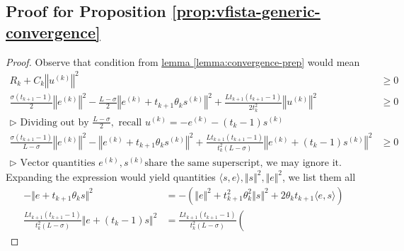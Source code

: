 \subsection{Proof for Proposition \ref*{prop:vfista-generic-convergence}}
    \begin{proof}\label{proof:vfista-generic-convergence}
        Observe that condition from \hyperref[lemma:convergence-prep]{lemma \ref*{lemma:convergence-prep}} would mean 
        \begin{align*}
            R_k + C_k\left\Vert
            u^{(k)}
            \right\Vert^2 &\ge 0
            \\
            \frac{\sigma(t_{k + 1} - 1)}{2}
            \left\Vert e^{(k)}\right\Vert^2
            - 
            \frac{L - \sigma}{2}
            \left\Vert e^{(k)} + 
                t_{k + 1}\theta_k s^{(k)}
            \right\Vert^2 
            + 
            \frac{Lt_{k + 1}(t_{k + 1} - 1)}{2t_k^2} 
            \left\Vert u^{(k)}\right\Vert^2 &\ge 0
            \\
            \triangleright 
            \text{ Dividing out by }\frac{L - \sigma}{2}, \text{ recall }u^{(k)} = -e^{(k)} - (t_{k} - 1)s^{(k)}&
            \\
            \frac{\sigma(t_{k +1} - 1)}{L - \sigma}
            \left\Vert e^{(k)}\right\Vert^2
            - 
            \left\Vert e^{(k)} + 
                t_{k + 1}\theta_k s^{(k)}
            \right\Vert^2 
            + 
            \frac{Lt_{k + 1}(t_{k + 1} - 1)}{t^2_k(L - \sigma)}
            \left\Vert 
                e^{(k)} + (t_{k} - 1)s^{(k)}
            \right\Vert^2
            &\ge  0
            \\ 
            \triangleright 
            \text{ Vector quantities }e^{(k)}, s^{(k)} \text{share the same superscript, we may ignore it.}
        \end{align*}
        Expanding the expression would yield quantities $\langle s, e\rangle, \Vert s\Vert^2, \Vert e\Vert^2$, we list them all 
        \begin{align*}
            - \Vert e + t_{k + 1}\theta_k s\Vert^2
            &= - \left(
                \Vert e\Vert^2 + t_{k + 1}^2\theta_k^2 \Vert s\Vert^2 + 
                2\theta_k t_{k + 1}\langle e, s\rangle
            \right)
            \\
            \frac{Lt_{k + 1}(t_{k + 1} - 1)}{t_k^2(L - \sigma)} \Vert 
                e + (t_k - 1)s
            \Vert^2
            &= 
            \frac{Lt_{k + 1}(t_{k + 1} - 1)}{t_k^2(L - \sigma)} 
            \left(

\end{align*}
\end{proof}
